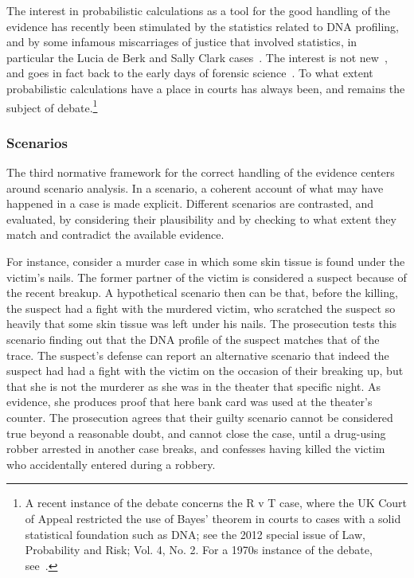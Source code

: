 \documentclass[10pt]{article}
\begin{document}
The interest in probabilistic calculations as a tool for the good handling of the evidence has recently been stimulated by the statistics related to DNA profiling, and by some infamous miscarriages of justice that involved statistics, in particular the Lucia de Berk and Sally Clark cases~\citep{dawidEtal2011,fenton2011,schnepsColmez2013}. The interest is not new~\citep{tillers2011}, and goes in fact back to the early days of forensic science~\citep{taroniEtal1998}. To what extent probabilistic calculations have a place in courts has always been, and remains the subject of debate.\footnote{A recent instance of the debate concerns the R v T case, where the UK Court of Appeal restricted the use of Bayes' theorem in courts to cases with a solid statistical foundation such as DNA; see the 2012 special issue of Law, Probability and Risk; Vol. 4, No. 2. For a 1970s instance of the debate, see~\citet{finkelsteinFairley1970,tribe1971}.}

\subsubsection{Scenarios}
\label{sec:introScen}
The third normative framework for the correct handling of the evidence centers around scenario analysis. In a scenario, a coherent account of what may have happened in a case is made explicit. Different scenarios are contrasted, and evaluated, by considering their plausibility and by checking to what extent they match and contradict the available evidence. 

For instance, consider a murder case in which some skin tissue is found under the victim's nails. The former partner of the victim is considered a suspect because of the recent breakup. A hypothetical scenario then can be that, before the killing, the suspect had a fight with the murdered victim, who scratched the suspect so heavily that some skin tissue was left under his nails. The prosecution tests this scenario finding out that the DNA profile of the suspect matches that of the trace. The suspect's defense can report an alternative scenario that indeed the suspect had had a fight with the victim on the occasion of their breaking up, but that she is not the murderer as she was in the theater that specific night. As evidence, she produces proof that here bank card was used at the theater's counter. The prosecution agrees that their guilty scenario cannot be considered true beyond a reasonable doubt, and cannot close the case, until a drug-using robber arrested in another case breaks, and confesses having killed the victim who accidentally entered during a robbery.
\end{document}
